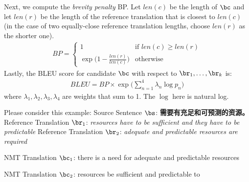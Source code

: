 \begin{parts}
    Next, we compute the \textit{brevity penalty} BP. Let $len(c)$ be the length of $\bc$ and let $len(r)$ be the length of the reference translation that is closest to $len(c)$ (in the case of two equally-close reference translation lengths, choose $len(r)$ as the shorter one). 
    \begin{align}
        BP = 
        \begin{cases}
            1 & \text{if } len(c) \ge len(r) \\
            \exp \big( 1 - \frac{len(r)}{len(c)} \big) & \text{otherwise}
        \end{cases}
    \end{align}
    Lastly, the BLEU score for candidate $\bc$ with respect to $\br_1,\dots,\br_k$ is:
    \begin{align}
        BLEU = BP \times \exp \Big( \sum_{n=1}^4 \lambda_n \log p_n \Big)
    \end{align}
    where $\lambda_1,\lambda_2,\lambda_3,\lambda_4$ are weights that sum to 1. The $\log$ here is natural log.
    \newline
    \begin{subparts}
        \subpart[5] Please consider this example: \newline
        Source Sentence $\bs$: \textbf{需要有充足和可预测的资源。} 
        \newline
        Reference Translation $\br_1$: \textit{resources have to be sufficient and they have to be predictable}
        \newline
        Reference Translation $\br_2$: \textit{adequate and predictable resources are required}
        
        NMT Translation $\bc_1$: there is a need for adequate and predictable resources
        
        NMT Translation $\bc_2$: resources be suﬀicient and predictable to
        

\end{subparts}
\end{parts}
